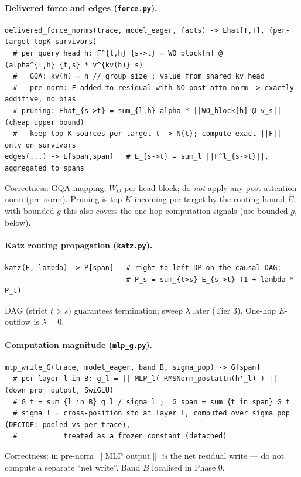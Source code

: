 \documentclass[11pt]{article}
\begin{document}
\paragraph{Delivered force and edges (\texttt{force.py}).}
\begin{lstlisting}
delivered_force_norms(trace, model_eager, facts) -> Ehat[T,T], (per-target topK survivors)
  # per query head h: F^{l,h}_{s->t} = WO_block[h] @ (alpha^{l,h}_{t,s} * v^{kv(h)}_s)
  #   GQA: kv(h) = h // group_size ; value from shared kv head
  #   pre-norm: F added to residual with NO post-attn norm -> exactly additive, no bias
  # pruning: Ehat_{s->t} = sum_{l,h} alpha * ||WO_block[h] @ v_s||  (cheap upper bound)
  #   keep top-K sources per target t -> N(t); compute exact ||F|| only on survivors
edges(...) -> E[span,span]   # E_{s->t} = sum_l ||F^l_{s->t}||, aggregated to spans
\end{lstlisting}
Correctness: GQA mapping; $W_O$ per-head block; do \emph{not} apply any post-attention norm (pre-norm).
Pruning is top-$K$ incoming per target by the routing bound $\widehat E$; with bounded $g$ this also
covers the one-hop computation signals (use bounded $g$, below).

\paragraph{Katz routing propagation (\texttt{katz.py}).}
\begin{lstlisting}
katz(E, lambda) -> P[span]   # right-to-left DP on the causal DAG:
                             # P_s = sum_{t>s} E_{s->t} (1 + lambda * P_t)
\end{lstlisting}
DAG (strict $t>s$) guarantees termination; sweep $\lambda$ later (Tier 3). One-hop $E$-outflow is
$\lambda{=}0$.

\paragraph{Computation magnitude (\texttt{mlp\_g.py}).}
\begin{lstlisting}
mlp_write_G(trace, model_eager, band B, sigma_pop) -> G[span]
  # per layer l in B: g_l = || MLP_l( RMSNorm_postattn(h'_l) ) ||   (down_proj output, SwiGLU)
  # G_t = sum_{l in B} g_l / sigma_l ;  G_span = sum_{t in span} G_t
  # sigma_l = cross-position std at layer l, computed over sigma_pop (DECIDE: pooled vs per-trace),
  #           treated as a frozen constant (detached)
\end{lstlisting}
Correctness: in pre-norm $\lVert\text{MLP output}\rVert$ \emph{is} the net residual write --- do not
compute a separate ``net write''. Band $B$ localised in Phase 0.
\end{document}
